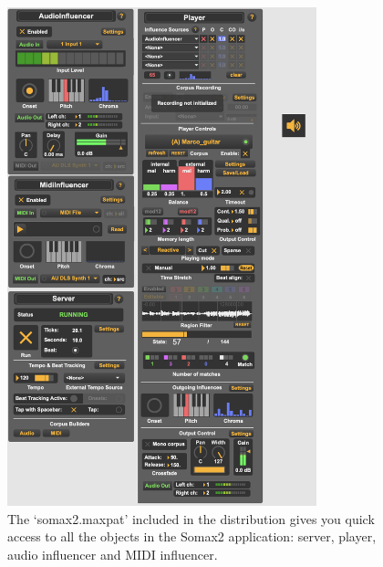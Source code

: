 \begin{figure}[H]
    \centering        
 	\includegraphics[width=0.8\textwidth]{somax2-6-user-guide/img/somax2-6.png}
    \caption{The `somax2.maxpat' included in the distribution gives you quick access to all the objects in the Somax2 application: server, player, audio influencer and MIDI influencer.}
    \label{fig:somax2_ui}
\end{figure}

